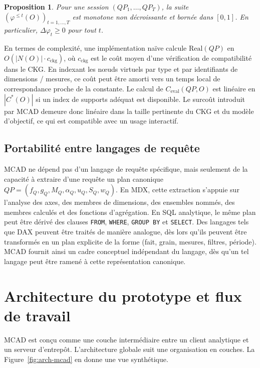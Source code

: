 \documentclass[journal]{IEEEtran}
\newtheorem{proposition}{Proposition}
\begin{document}
\begin{proposition}
\label{prop:session}
Pour une session $(QP_1,\dots,QP_T)$, la suite $(\varphi^{\le t}(O))_{t=1,\dots,T}$ est monotone non décroissante et bornée dans $[0,1]$. En particulier, $\Delta\varphi_t\ge 0$ pour tout $t$.
\end{proposition}

En termes de complexité, une implémentation naïve calcule $\mathrm{Real}(QP)$ en $O(|N(O)|\cdot c_{\mathrm{ckg}})$, où $c_{\mathrm{ckg}}$ est le coût moyen d'une vérification de compatibilité dans le CKG. En indexant les nœuds virtuels par type et par identifiants de dimensions / mesures, ce coût peut être amorti vers un temps local de correspondance proche de la constante. Le calcul de $C_{\mathrm{eval}}(QP,O)$ est linéaire en $|C^*(O)|$ si un index de supports adéquat est disponible. Le surcoût introduit par MCAD demeure donc linéaire dans la taille pertinente du CKG et du modèle d'objectif, ce qui est compatible avec un usage interactif.

\subsection{Portabilité entre langages de requête}

MCAD ne dépend pas d'un langage de requête spécifique, mais seulement de la capacité à extraire d'une requête un plan canonique $QP=(f_Q,g_Q,M_Q,\alpha_Q,u_Q,S_Q,w_Q)$. En MDX, cette extraction s'appuie sur l'analyse des axes, des membres de dimensions, des ensembles nommés, des membres calculés et des fonctions d'agrégation. En SQL analytique, le même plan peut être dérivé des clauses \texttt{FROM}, \texttt{WHERE}, \texttt{GROUP BY} et \texttt{SELECT}. Des langages tels que DAX peuvent être traités de manière analogue, dès lors qu'ils peuvent être transformés en un plan explicite de la forme (fait, grain, mesures, filtres, période). MCAD fournit ainsi un cadre conceptuel indépendant du langage, dès qu'un tel langage peut être ramené à cette représentation canonique.

\section{Architecture du prototype et flux de travail}
\label{sec:arch}

MCAD est conçu comme une couche intermédiaire entre un client analytique et un serveur d'entrepôt. L'architecture globale suit une organisation en couches. La Figure~\ref{fig:arch-mcad} en donne une vue synthétique.
\end{document}
